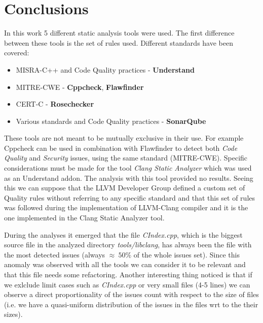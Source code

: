 \chapter{Conclusions}

In this work 5 different static analysis tools were used.\newline
The first difference between these tools is the set of rules used. Different standards have been covered:

\begin{itemize}
	\item MISRA-C++ and Code Quality practices - \textbf{Understand}
	\item MITRE-CWE - \textbf{Cppcheck}, \textbf{Flawfinder}
	\item CERT-C - \textbf{Rosechecker}
	\item Various standards and Code Quality practices - \textbf{SonarQube}
\end{itemize}

These tools are not meant to be mutually exclusive in their use. For example Cppcheck can be used in combination with Flawfinder to detect both \textsl{Code Quality} and \textsl{Security} issues, using the same standard (MITRE-CWE).\newline
Specific considerations must be made for the tool \textsl{Clang Static Analyzer} which was used as an Understand addon.\newline
The analysis with this tool provided no results. Seeing this we can suppose that the LLVM Developer Group defined a custom set of Quality rules without referring to any specific standard and that this set of rules was followed during the implementation of LLVM-Clang compiler and it is the one implemented in the Clang Static Analyzer tool.
\newline\newline

During the analyses it emerged that the file \textsl{CIndex.cpp}, which is the biggest source file in the analyzed directory \textsl{tools/libclang}, has always been the file with the most detected issues (always $\approx\: 50\%$ of the whole issues set). Since this anomaly was observed with all the tools we can consider it to be relevant and that this file needs some refactoring.\newline
Another interesting thing noticed is that if we exlclude limit cases such as \textsl{CIndex.cpp} or very small files (4-5 lines) we can observe a direct proportionality of the issues count with respect to the size of files (i.e. we have a quasi-uniform distribution of the issues in the files wrt to the their sizes).\newline\newline

